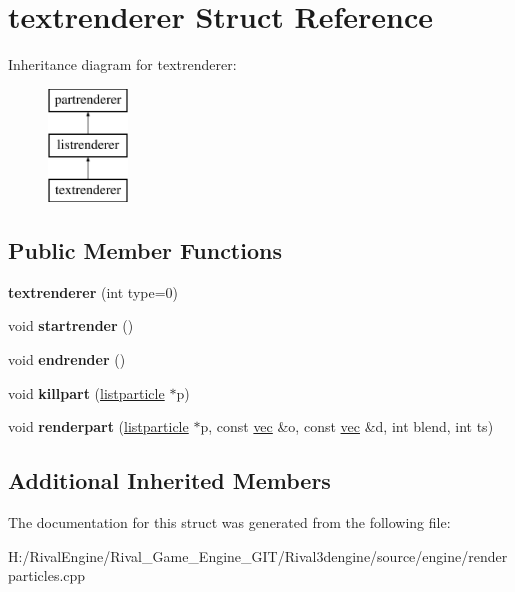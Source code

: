 \hypertarget{structtextrenderer}{}\section{textrenderer Struct Reference}
\label{structtextrenderer}
Inheritance diagram for textrenderer\+:\begin{figure}[H]
\begin{center}
\leavevmode
\includegraphics[height=3.000000cm]{structtextrenderer}
\end{center}
\end{figure}
\subsection*{Public Member Functions}
\begin{DoxyCompactItemize}
\item 
\mbox{\label{structtextrenderer_a22c71cdb9617bc1aa43962fc2ef50b18}} 
{\bfseries textrenderer} (int type=0)
\item 
\mbox{\label{structtextrenderer_a8f47ddfdf783110a6ccf44b0f842424b}} 
void {\bfseries startrender} ()
\item 
\mbox{\label{structtextrenderer_aa21bd1ca76d170d4c3d2af9dfd4f6b8b}} 
void {\bfseries endrender} ()
\item 
\mbox{\label{structtextrenderer_abac148702e38058b656c5927c8b797e7}} 
void {\bfseries killpart} (\hyperlink{structlistparticle}{listparticle} $\ast$p)
\item 
\mbox{\label{structtextrenderer_adb66b51cb21ef811a68085e76d3d3e55}} 
void {\bfseries renderpart} (\hyperlink{structlistparticle}{listparticle} $\ast$p, const \hyperlink{structvec}{vec} \&o, const \hyperlink{structvec}{vec} \&d, int blend, int ts)
\end{DoxyCompactItemize}
\subsection*{Additional Inherited Members}


The documentation for this struct was generated from the following file\+:\begin{DoxyCompactItemize}
\item 
H\+:/\+Rival\+Engine/\+Rival\+\_\+\+Game\+\_\+\+Engine\+\_\+\+G\+I\+T/\+Rival3dengine/source/engine/renderparticles.\+cpp\end{DoxyCompactItemize}
